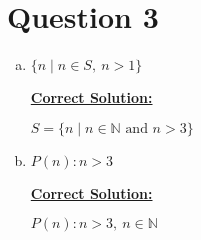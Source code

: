 \documentclass[12pt]{article}
\begin{document}
\section*{Question 3}
\begin{enumerate}[a.]
    \item

    $\{n \mid n \in S,\:n > 1\}$

    \begin{mdframed}
        \underline{\textbf{Correct Solution:}}

        \bigskip

        \color{red}$S = \{n \mid n \in \mathbb{N} \text{ and } n > 3\}$\color{black}

    \end{mdframed}

    \item

    $P(n): n > 3$

    \begin{mdframed}
        \underline{\textbf{Correct Solution:}}

        \bigskip

        \color{red}$P(n): n > 3,\:n \in \mathbb{N}$\color{black}

    \end{mdframed}
\end{enumerate}
\end{document}
